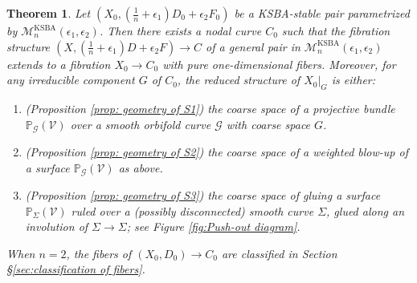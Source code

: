 \documentclass[a4paper,12pt]{amsart}
\newcommand{\mtc}[1]{\mathcal{#1}}
\DeclareMathOperator{\KSBA}{\mathrm{KSBA}}
\newcommand{\bP}{{\mathbb P}}
\newcommand{\sY}{{\mathscr{Y}}}
\newcommand{\sD}{{\mathscr{D}}}
\newcommand{\cG}{{\mathcal{G}}}
\newcommand{\cV}{{\mathcal{V}}}
\newcommand\spec{\text{\rm Spec}}
\newtheorem{theorem}{Theorem}[section]
\theoremstyle{definition}
\theoremstyle{remark}
\begin{document}
\begin{theorem}\label{thm_intro_description_boundary}
    Let $(X_0,(\frac{1}{n} +\epsilon_1)D_0 + \epsilon_2F_0)$ be a KSBA-stable pair parametrized by $\mtc{M}^{\KSBA}_n(\epsilon_1,\epsilon_2)$. Then there exists a nodal curve $C_0$ such that the fibration structure $(X,(\frac{1}{n} +\epsilon_1)D + \epsilon_2F)\to C$ of a general pair in $\mtc{M}^{\KSBA}_n(\epsilon_1,\epsilon_2)$ extends to a fibration $X_0\to C_0$ with pure one-dimensional fibers. Moreover, for any irreducible component $G$ of $C_0$, the reduced structure of $X_0|_G$ is either:
    \begin{enumerate}
        \item \textup{(Proposition \ref{prop: geometry of S1})} the coarse space of a projective bundle $\bP_\cG(\cV)$ over a smooth orbifold curve $\cG$ with coarse space $G$.
        \item \textup{(Proposition \ref{prop: geometry of S2})} the coarse space of a weighted blow-up of a surface $\bP_\cG(\cV)$ as above.
        \item \textup{(Proposition \ref{prop: geometry of S3})} the coarse space of gluing a surface $\bP_\Sigma(\cV)$ ruled over a (possibly disconnected) smooth curve $\Sigma$, glued along an involution of $\Sigma\to\Sigma$; see Figure \ref{fig:Push-out diagram}.
    \end{enumerate}
    When $n=2$, the fibers of $(X_0,D_0)\to C_0$ are classified in Section \S\ref{sec:classification of fibers}.
    \end{theorem}

\end{document}
